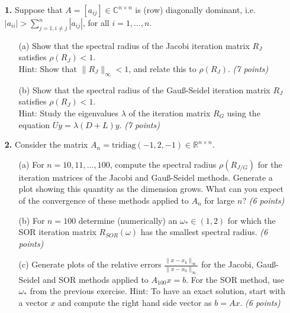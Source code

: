 \documentclass[10pt]{report}
\begin{document}
\begin{enumerate}
    
  \item[\textbf{1.}]Suppose that $A=[a_{ij}]\in\mathbb{C}^{n\times n}$ is (row) diagonally dominant, i.e. $|a_{ii}|>\sum_{j=1,i\neq j}^n|a_{ij}|$, for all $i=1,\ldots,n$.
  \begin{enumerate}
    \item[(a)] Show that the spectral radius of the Jacobi iteration matrix $R_J$ satisfies  $\rho(R_J) <1$.\\
    Hint: Show that $\|R_J\|_{\infty}<1$, and relate this to $\rho(R_J)$. \textit{(7 points)}

    \item[(b)] Show that the spectral radius of the Gau\ss-Seidel iteration matrix $R_J$ satisfies $\rho(R_J) <1$.\\
Hint: Study the eigenvalues $\lambda$ of the iteration matrix
      $R_G$ using the equation $Uy=\lambda(D+L)y$. \linebreak 
\textit{(7 points)}
\end{enumerate}

\vspace{0.1cm} 

\item[\textbf{2.}] Consider the matrix $A_n=\text{tridiag}(-1,2,-1)\in\mathbb{R}^{n\times n}$.
  \begin{enumerate}
    \item[(a)] For  $n=10,11,\ldots,100$, compute the spectral radius $\rho(R_{J/G})$ for the iteration matrices of the Jacobi and Gau\ss-Seidel methods. Generate a plot showing this quantity as the dimension grows. What can you expect of the convergence  of these methods applied to $A_n$ for large $n$? \textit{(6 points)}

    \item[(b)] For $n=100$ determine (numerically) an $\omega_*\in(1,2)$ for which the SOR iteration matrix $R_{SOR}(\omega)$ has the smallest spectral radius. \textit{(6 points)}


    \item[(c)] Generate plots of the relative errors $\frac{\|x-x_k\|_{\infty}}{\|x-x_0\|_{\infty}}$ for the Jacobi, Gau\ss-Seidel and SOR methods applied to $A_{100}x=b$. For the SOR method, use $\omega_*$ from the previous exercise. Hint: To have an exact solution, start with a vector $x$ and compute the right hand side vector as $b=Ax$.  \textit{(6 points)} 

\vspace{0.1cm} 


\end{enumerate}
\end{enumerate}
\end{document}
